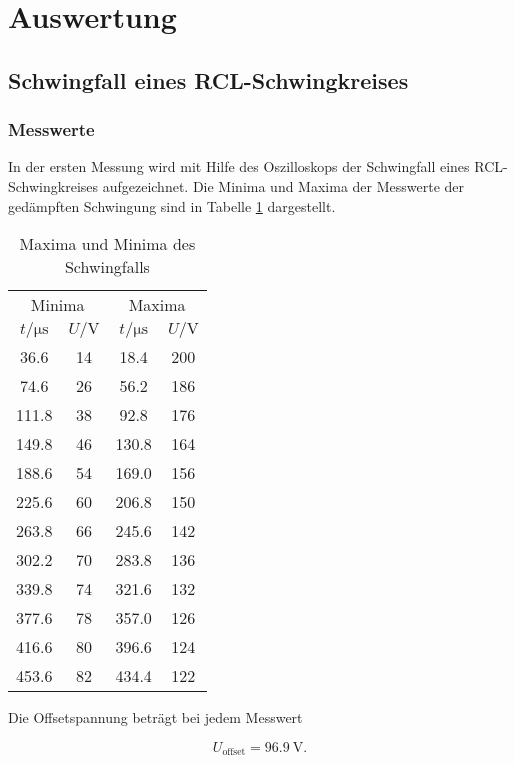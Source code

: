 \section{Auswertung}
\label{sec:Auswertung}

\subsection{Schwingfall eines RCL-Schwingkreises}


\subsubsection{Messwerte}

In der ersten Messung wird mit Hilfe des Oszilloskops der Schwingfall eines
RCL-Schwingkreises aufgezeichnet. Die Minima und Maxima der Messwerte der
gedämpften Schwingung sind in Tabelle \ref{tab:Schwingfall} dargestellt.

\begin{table}[h]
  \centering
  \begin{tabular}{c c c c}
    \toprule
    \multicolumn{2}{c}{Minima} & \multicolumn{2}{c}{Maxima} \\
    $t/\si{\micro\second}$ & $U/\si{\V}$
    & $t/\si{\micro\second}$ & $U/\si{\V}$  \\
    \midrule
    36.6 & 14 & 18.4 & 200 \\
    74.6 & 26 & 56.2 & 186 \\
    111.8 & 38 & 92.8 & 176 \\
    149.8 & 46 & 130.8 & 164 \\
    188.6 & 54 & 169.0 & 156 \\
    225.6 & 60 & 206.8 & 150 \\
    263.8 & 66 & 245.6 & 142 \\
    302.2 & 70 & 283.8 & 136 \\
    339.8 & 74 & 321.6 & 132 \\
    377.6 & 78 & 357.0 & 126 \\
    416.6 & 80 & 396.6 & 124 \\
    453.6 & 82 & 434.4 & 122 \\
    \bottomrule
  \end{tabular}
  \caption{Maxima und Minima des Schwingfalls}
  \label{tab:Schwingfall}
\end{table}

Die Offsetspannung beträgt bei jedem Messwert

\begin{equation}
  U_\text{offset} = \SI{96.9}{\V}.
\end{equation}

